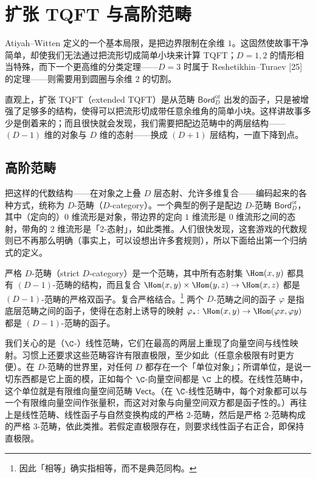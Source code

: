 
\section{扩张 TQFT 与高阶范畴}

Atiyah--Witten 定义的一个基本局限，是把边界限制在余维 $1$。这固然使故事干净简单，却使我们无法通过把流形切成简单小块来计算 TQFT；$D=1,2$ 的情形相当特殊，而下一个更高维的分类定理——$D=3$ 时属于 Reshetikhin--Turaev [25] 的定理——则需要用到圆圈与余维 $2$ 的切割。

直观上，扩张 TQFT（extended TQFT）是从范畴 $\mathsf{Bord}^{\mathrm{or}}_D$ 出发的函子，只是被增强了足够多的结构，使得可以把流形切成带任意余维角的简单小块。这样讲故事多少是倒着来的；而且很快就会发现，我们需要把配边范畴中的两层结构——$(D-1)$ 维的对象与 $D$ 维的态射——换成 $(D+1)$ 层结构，一直下降到点。

\subsection{高阶范畴}

把这样的代数结构——在对象之上叠 $D$ 层态射、允许多维复合——编码起来的各种方式，统称为 $D$-范畴（$D$-category）。一个典型的例子是配边 $D$-范畴 $\mathsf{Bord}^{\mathrm{or}}_D$，其中（定向的）$0$ 维流形是对象，带边界的定向 $1$ 维流形是 $0$ 维流形之间的态射，带角的 $2$ 维流形是「$2$-态射」，如此类推。人们很快发现，这套游戏的代数规则已不再那么明确（事实上，可以设想出许多套规则），所以下面给出第一个归纳式的定义。

\begin{definition}
严格 $D$-范畴（strict $D$-category）是一个范畴，其中所有态射集 $\Hom(x,y)$ 都具有 $(D-1)$-范畴的结构，而且复合 $\Hom(x,y)\times\Hom(y,z)\to\Hom(x,z)$ 都是 $(D-1)$-范畴的严格双函子。复合严格结合。\footnote{因此「相等」确实指相等，而不是典范同构。} 两个 $D$-范畴之间的函子 $\varphi$ 是指底层范畴之间的函子，使得在态射上诱导的映射 $\varphi_*\colon\Hom(x,y)\to\Hom(\varphi x,\varphi y)$ 都是 $(D-1)$-范畴的函子。
\end{definition}

我们关心的是（$\C$-）线性范畴，它们在最高的两层上重现了向量空间与线性映射。习惯上还要求这些范畴容许有限直极限，至少如此（任意余极限有时更方便）。在 $D$-范畴的世界里，对任何 $D$ 都存在一个「单位对象」；所谓单位，是说一切东西都是它上面的模，正如每个 $\C$-向量空间都是 $\C$ 上的模。在线性范畴中，这个单位就是有限维向量空间范畴 $\mathsf{Vect}$。（在 $\C$-线性范畴中，每个对象都可以与一个有限维向量空间作张量积，而这对对象与向量空间双方都是函子性的。）再往上是线性范畴、线性函子与自然变换构成的严格 $2$-范畴，然后是严格 $2$-范畴构成的严格 $3$-范畴，依此类推。若假定直极限存在，则要求线性函子右正合，即保持直极限。

